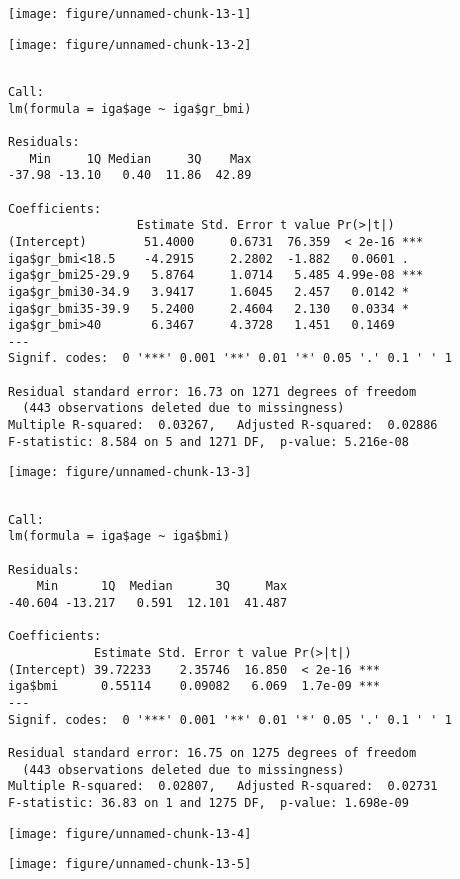 \documentclass[11pt,a4paper]{article}\usepackage[]{graphicx}\usepackage[]{color}
\makeatletter
\def\maxwidth{ %
  \ifdim\Gin@nat@width>\linewidth
    \linewidth
  \else
    \Gin@nat@width
  \fi
}
\newenvironment{kframe}{%
 \def\at@end@of@kframe{}%
 \ifinner\ifhmode%
  \def\at@end@of@kframe{\end{minipage}}%
  \begin{minipage}{\columnwidth}%
 \fi\fi%
 \def\FrameCommand##1{\hskip\@totalleftmargin \hskip-\fboxsep
 \colorbox{shadecolor}{##1}\hskip-\fboxsep
     \hskip-\linewidth \hskip-\@totalleftmargin \hskip\columnwidth}%
 \MakeFramed {\advance\hsize-\width
   \@totalleftmargin\z@ \linewidth\hsize
   \@setminipage}}%
 {\par\unskip\endMakeFramed%
 \at@end@of@kframe}
\newenvironment{knitrout}{}{} %
\makeatother
\begin{document}
\begin{knitrout}
\color{fgcolor}
\texttt{[image: figure/unnamed-chunk-13-1]} 

\texttt{[image: figure/unnamed-chunk-13-2]} 
\begin{kframe}\begin{verbatim}

Call:
lm(formula = iga$age ~ iga$gr_bmi)

Residuals:
   Min     1Q Median     3Q    Max 
-37.98 -13.10   0.40  11.86  42.89 

Coefficients:
                  Estimate Std. Error t value Pr(>|t|)    
(Intercept)        51.4000     0.6731  76.359  < 2e-16 ***
iga$gr_bmi<18.5    -4.2915     2.2802  -1.882   0.0601 .  
iga$gr_bmi25-29.9   5.8764     1.0714   5.485 4.99e-08 ***
iga$gr_bmi30-34.9   3.9417     1.6045   2.457   0.0142 *  
iga$gr_bmi35-39.9   5.2400     2.4604   2.130   0.0334 *  
iga$gr_bmi>40       6.3467     4.3728   1.451   0.1469    
---
Signif. codes:  0 '***' 0.001 '**' 0.01 '*' 0.05 '.' 0.1 ' ' 1

Residual standard error: 16.73 on 1271 degrees of freedom
  (443 observations deleted due to missingness)
Multiple R-squared:  0.03267,	Adjusted R-squared:  0.02886 
F-statistic: 8.584 on 5 and 1271 DF,  p-value: 5.216e-08
\end{verbatim}
\end{kframe}
\texttt{[image: figure/unnamed-chunk-13-3]} 
\begin{kframe}\begin{verbatim}

Call:
lm(formula = iga$age ~ iga$bmi)

Residuals:
    Min      1Q  Median      3Q     Max 
-40.604 -13.217   0.591  12.101  41.487 

Coefficients:
            Estimate Std. Error t value Pr(>|t|)    
(Intercept) 39.72233    2.35746  16.850  < 2e-16 ***
iga$bmi      0.55114    0.09082   6.069  1.7e-09 ***
---
Signif. codes:  0 '***' 0.001 '**' 0.01 '*' 0.05 '.' 0.1 ' ' 1

Residual standard error: 16.75 on 1275 degrees of freedom
  (443 observations deleted due to missingness)
Multiple R-squared:  0.02807,	Adjusted R-squared:  0.02731 
F-statistic: 36.83 on 1 and 1275 DF,  p-value: 1.698e-09
\end{verbatim}
\end{kframe}
\texttt{[image: figure/unnamed-chunk-13-4]} 

\texttt{[image: figure/unnamed-chunk-13-5]} 

\end{knitrout}
\end{document}
